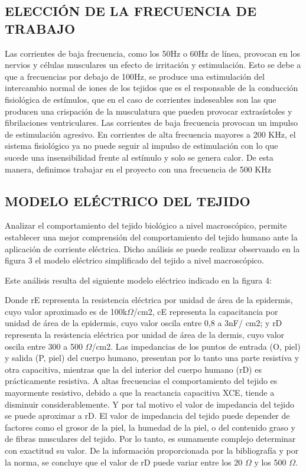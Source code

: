 \documentclass[10pt, conference, final, twocolumn, sansserif]{IEEEtran}
\begin{document}
\subsection{ELECCIÓN DE LA FRECUENCIA DE TRABAJO}
Las corrientes de baja frecuencia, como los 50Hz o 60Hz de línea, provocan en los nervios y células musculares un efecto de irritación y estimulación. Esto se debe a que a frecuencias por debajo de 100Hz, se produce una estimulación del intercambio normal de iones de los tejidos que es el responsable de la conducción fisiológica de estímulos, que en el caso de corrientes indeseables son las que producen una crispación de la musculatura que pueden provocar extrasístoles y fibrilaciones ventriculares.
Las corrientes de baja frecuencia provocan un impulso de estimulación agresivo. En corrientes de alta frecuencia mayores a 200 KHz, el sistema fisiológico ya no puede seguir al impulso de estimulación con lo que sucede una insensibilidad frente al estímulo y solo se genera calor.
De esta manera, definimos trabajar en el proyecto  con una frecuencia de 500 KHz

\subsection{MODELO ELÉCTRICO DEL TEJIDO}
Analizar el comportamiento del tejido biológico a nivel macroscópico, permite establecer una mejor comprensión del comportamiento del tejido humano ante la aplicación de corriente eléctrica. Dicho análisis se puede realizar observando en la figura 3 el modelo eléctrico simplificado del tejido a nivel macroscópico.

Este análisis resulta del siguiente modelo eléctrico indicado en la figura 4:

Donde rE representa la resistencia eléctrica por unidad de área de la epidermis, cuyo valor aproximado es de
100k$\Omega$/cm2, cE representa la capacitancia por unidad de área de la epidermis, cuyo valor oscila entre 0,8 a 3nF/ cm2; y rD representa la resistencia eléctrica por unidad de área de la dermis, cuyo valor oscila entre 300 a 500 $\Omega$/cm2.
Las impedancias de los puntos de entrada (O, piel) y salida (P, piel) del cuerpo humano, presentan por lo tanto una parte resistiva y otra capacitiva, mientras que la del interior del cuerpo humano (rD) es prácticamente resistiva.
A altas frecuencias el comportamiento del tejido es
mayormente resistivo, debido a que la reactancia capacitiva XCE, tiende a disminuir considerablemente. Y por tal motivo el valor de impedancia del tejido se puede aproximar a rD.
El valor de impedancia del tejido puede depender de
factores como el grosor de la piel, la humedad de la piel, o del contenido graso y de fibras musculares del tejido. Por lo tanto, es sumamente complejo determinar con exactitud su valor. De la información proporcionada por la bibliografía y por la norma, se concluye que el valor de rD puede variar entre los 20 $\Omega$ y los 500 $\Omega$.
\end{document}
